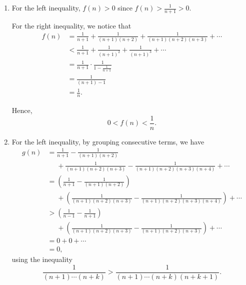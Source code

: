\Question{\currfilebase}
\begin{enumerate}
    \item For the left inequality, \(f(n) > 0\) since \(f(n) > \frac{1}{n + 1} > 0\).

          For the right inequality, we notice that
          \begin{align*}
              f(n) & = \frac{1}{n + 1} + \frac{1}{(n + 1) (n + 2)} + \frac{1}{(n + 1) (n + 2) (n + 3)} + \cdots \\
                   & < \frac{1}{n + 1} + \frac{1}{(n + 1)^2} + \frac{1}{(n + 1)^3} + \cdots                     \\
                   & = \frac{1}{n + 1} \cdot \frac{1}{1 - \frac{1}{n + 1}}                                      \\
                   & = \frac{1}{(n + 1) - 1}                                                                    \\
                   & = \frac{1}{n}.
          \end{align*}

          Hence,
          \[
              0 < f(n) < \frac{1}{n}.
          \]

    \item For the left inequality, by grouping consecutive terms, we have
          \begin{align*}
              g(n) & = \frac{1}{n + 1} - \frac{1}{(n + 1) (n + 2)}                                                                     \\
                   & \phantom{=} + \frac{1}{(n + 1) (n + 2) (n + 3)} - \frac{1}{(n + 1) (n + 2) (n + 3) (n + 4)} + \cdots              \\
                   & = \left(\frac{1}{n + 1} - \frac{1}{(n + 1) (n + 2)}\right)                                                        \\
                   & \phantom{=} + \left(\frac{1}{(n + 1) (n + 2) (n + 3)} - \frac{1}{(n + 1) (n + 2) (n + 3) (n + 4)}\right) + \cdots \\
                   & > \left(\frac{1}{n - 1} - \frac{1}{n + 1}\right)                                                                  \\
                   & \phantom{=} + \left(\frac{1}{(n + 1) (n + 2) (n + 3)} - \frac{1}{(n + 1) (n + 2) (n + 3)}\right) + \cdots         \\
                   & = 0 + 0 + \cdots                                                                                                  \\
                   & = 0,
          \end{align*}
          using the inequality
          \[
              \frac{1}{(n + 1) \cdots (n + k)} > \frac{1}{(n + 1) \cdots (n + k) (n + k + 1)}.
          \]


\end{enumerate}
